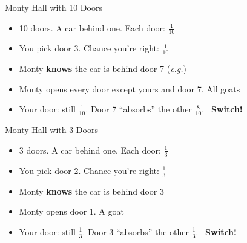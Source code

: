 \begin{frame}{Monty Hall with 10 Doors}
\centering
{}
\bsk
\raggedright
\begin{itemize}
    \item<1-> 10 doors. A car behind one. Each door: $\tfrac{1}{10}$
    \item<2-> You pick door 3. Chance you're right: $\tfrac{1}{10}$
    \item<3-> Monty \textbf{knows} the car is behind door 7 (\textit{e.g.})
    \item<4-> Monty opens every door except yours and door 7. All goats
    \item<4-> Your door: still $\tfrac{1}{10}$. Door 7 ``absorbs'' the other $\tfrac{8}{10}$. \ \textbf{Switch!}
\end{itemize}
\vfill
\vspace{-0.2in}
\end{frame}

\begin{frame}{Monty Hall with 3 Doors}
\centering
{}
\bsk
\raggedright
\begin{itemize}
    \item<1-> 3 doors. A car behind one. Each door: $\tfrac{1}{3}$
    \item<2-> You pick door 2. Chance you're right: $\tfrac{1}{3}$
    \item<3-> Monty \textbf{knows} the car is behind door 3
    \item<4-> Monty opens door 1. A goat
    \item<4-> Your door: still $\tfrac{1}{3}$. Door 3 ``absorbs'' the other $\tfrac{1}{3}$. \ \textbf{Switch!}
\end{itemize}
\vfill
{}
\vspace{-0.2in}
\end{frame}

